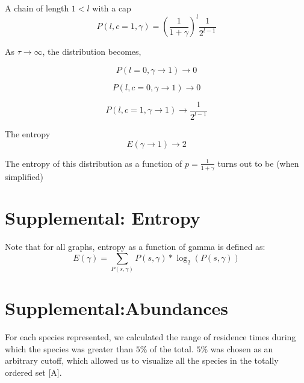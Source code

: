 \documentclass{article}
\begin{document}
A chain of length $1<l$ with a cap
\begin{equation}
P(l, c=1,\gamma)=(\frac{1}{1+\gamma})^l\frac{1}{2^{l-1}}
\end{equation}


As $\tau \rightarrow\infty$, the distribution becomes,

\begin{equation}
P(l=0,\gamma\rightarrow 1)\rightarrow 0
\end{equation}

\begin{equation}
P(l, c=0, \gamma\rightarrow 1)\rightarrow 0
\end{equation}

\begin{equation}
P(l, c=1, \gamma\rightarrow 1) \rightarrow \frac{1}{2^{l-1}}
\end{equation}

The entropy
\begin{equation}
E(\gamma\rightarrow 1)\rightarrow 2
\end{equation}

The entropy of this distribution as a function of $p=\frac{1}{1+\gamma}$ turns out to be (when simplified)

\section*{Supplemental: Entropy}
Note that for all graphs, entropy as a function of gamma is defined as:
\begin{equation}
E(\gamma)=\sum_{P(s,\gamma)}P(s,\gamma)*\log_2(P(s,\gamma))
\end{equation}



\section*{Supplemental:Abundances}
For each species represented, we calculated the range of residence times during which the species was greater than $5\%$ of the total. $5\%$ was chosen as an arbitrary cutoff, which allowed us to visualize all the species in the totally ordered set [A]. 
 
\end{document}
